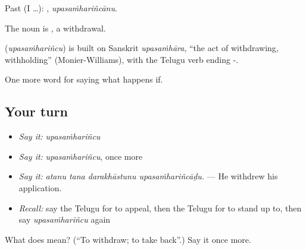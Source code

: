 Past (I …): , \emph{upasaṁhariñcānu}.

The noun is , a withdrawal.

\begin{cousinweb}
\textbf{} (\emph{upasaṁhariñcu}) is built on Sanskrit \emph{upasaṁhāra}, \textquotedblleft{}the act of withdrawing, withholding\textquotedblright{} (Monier-Williams), with the Telugu verb ending -.
\end{cousinweb}

\begin{grammarlens}[title={What you've built}]
One more word for saying what happens if.
\end{grammarlens}

\subsection*{Your turn}
\begin{itemize}
\raggedright
  \item \emph{Say it:} \emph{upasaṁhariñcu}
  \item \emph{Say it:} \emph{upasaṁhariñcu}, once more
  \item \emph{Say it:} \emph{atanu tana darakhāstunu upasaṁhariñcāḍu.} — He withdrew his application.
  \item \emph{Recall:} say the Telugu for to appeal, then the Telugu for to stand up to, then say \emph{upasaṁhariñcu} again
\end{itemize}

\begin{tcolorbox}[breakable,colback=teal!4,colframe=teal!35!black,title={Before you move on}]
What does  mean? (\textquotedblleft{}To withdraw; to take back\textquotedblright{}.) Say it once more.
\end{tcolorbox}
